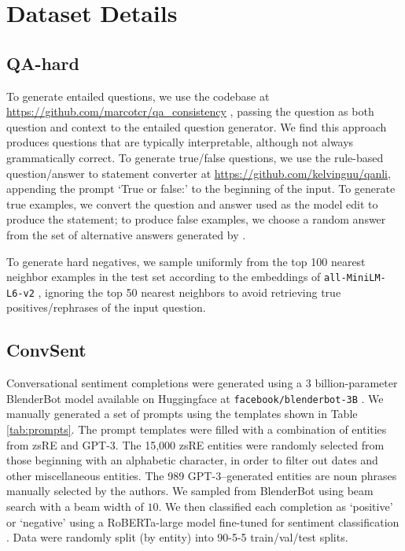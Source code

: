 \section{Dataset Details}
\subsection{QA-hard}
To generate entailed questions, we use the codebase at \href{https://github.com/marcotcr/qa_consistency}{https://github.com/marcotcr/qa\_consistency} \citep{ribeiro2019red}, passing the question as both question and context to the entailed question generator. We find this approach produces questions that are typically interpretable, although not always grammatically correct. To generate true/false questions, we use the rule-based question/answer to statement converter at \href{https://github.com/kelvinguu/qanli}{https://github.com/kelvinguu/qanli}, appending the prompt `True or false:' to the beginning of the input. To generate true examples, we convert the question and answer used as the model edit to produce the statement; to produce false examples, we choose a random answer from the set of alternative answers generated by \citet{Cao2021EditingFK}.

To generate hard negatives, we sample uniformly from the top 100 nearest neighbor examples in the test set according to the embeddings of \texttt{all-MiniLM-L6-v2} \citep{reimers-2019-sentence-bert}, ignoring the top 50 nearest neighbors to avoid retrieving true positives/rephrases of the input question.


\subsection{ConvSent}
\label{sec:conv_data_gen}
Conversational sentiment completions were generated using a 3 billion-parameter BlenderBot model available on Huggingface at \texttt{facebook/blenderbot-3B} \cite{roller2021recipes}. We manually generated a set of prompts using the templates shown in Table \ref{tab:prompts}. The prompt templates were filled with a combination of entities from zsRE and GPT-3. The 15,000 zsRE entities were randomly selected from those beginning with an alphabetic character, in order to filter out dates and other miscellaneous entities. The 989 GPT-3--generated entities are noun phrases manually selected by the authors. We sampled from BlenderBot using beam search with a beam width of $10$. We then classified each completion as `positive' or `negative' using a RoBERTa-large model fine-tuned for sentiment classification \cite{heitmann2020}. Data were randomly split (by entity) into 90-5-5 train/val/test splits.


